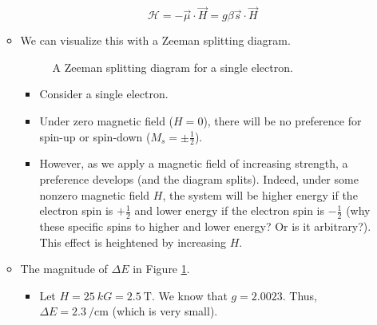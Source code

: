 \documentclass[../notes.tex]{subfiles}
\begin{document}
\begin{itemize}
\begin{itemize}
        \begin{equation*}
            \mathcal{H} = -\vec{\mu}\cdot\vec{H}
            = g\beta\vec{s}\cdot\vec{H}
        \end{equation*}
        \item We can visualize this with a Zeeman splitting diagram.
        \begin{figure}[h!]
            \centering
            \caption{A Zeeman splitting diagram for a single electron.}
            \label{fig:zeemanSplitting-1e}
        \end{figure}
        \begin{itemize}
            \item Consider a single electron.
            \item Under zero magnetic field ($H=0$), there will be no preference for spin-up or spin-down ($M_s=\pm\frac{1}{2}$).
            \item However, as we apply a magnetic field of increasing strength, a preference develops (and the diagram splits). Indeed, under some nonzero magnetic field $H$, the system will be higher energy if the electron spin is $+\frac{1}{2}$ and lower energy if the electron spin is $-\frac{1}{2}$ (why these specific spins to higher and lower energy? Or is it arbitrary?). This effect is heightened by increasing $H$.
        \end{itemize}
        \item The magnitude of $\Delta E$ in Figure \ref{fig:zeemanSplitting-1e}.
        \begin{itemize}
            \item Let $H=\SI{25}{kG}=\SI{2.5}{\tesla}$. We know that $g=2.0023$. Thus, $\Delta E=\SI{2.3}{\per\centi\meter}$ (which is very small).

\end{itemize}
\end{itemize}
\end{itemize}
\end{document}
